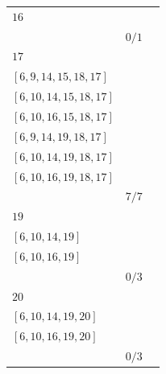 \documentclass[12pt, a4paper]{extarticle}
\begin{document}
\begin{table}[h!]
\begin{tabularx}{\textwidth}{|X|X|X|}
        \hline
        $16$ & \begin{tabular}{@{}l@{}} $[6, 10, 16]$ \\ \end{tabular} & $0/1$ \\
        \hline
        $17$ & \begin{tabular}{@{}l@{}} $[6, 9, 13, 15, 18, 17]$ \\  $[6, 9, 14, 15, 18, 17]$ \\  $[6, 10, 14, 15, 18, 17]$ \\  $[6, 10, 16, 15, 18, 17]$ \\  $[6, 9, 14, 19, 18, 17]$ \\  $[6, 10, 14, 19, 18, 17]$ \\  $[6, 10, 16, 19, 18, 17]$ \\ \end{tabular} & $7/7$ \\
        \hline
        $19$ & \begin{tabular}{@{}l@{}} $[6, 9, 14, 19]$ \\  $[6, 10, 14, 19]$ \\  $[6, 10, 16, 19]$ \\ \end{tabular} & $0/3$ \\
        \hline
        $20$ & \begin{tabular}{@{}l@{}} $[6, 9, 14, 19, 20]$ \\  $[6, 10, 14, 19, 20]$ \\  $[6, 10, 16, 19, 20]$ \\ \end{tabular} & $0/3$ \\
        \hline
    \end{tabularx}
\end{table}
\end{document}
